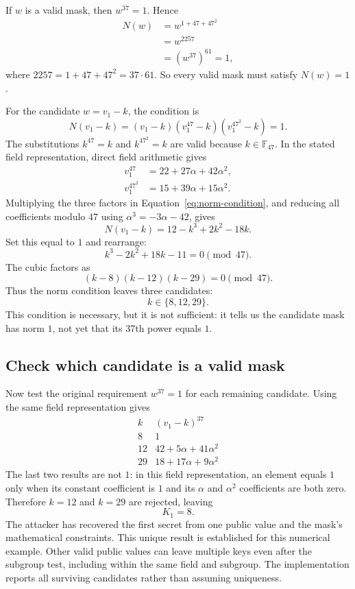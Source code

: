 \documentclass[11pt]{article}
\begin{document}
If $w$ is a valid mask, then $w^{37}=1$. Hence
\begin{align*}
    N(w)&=w^{1+47+47^2}\\
        &=w^{2257}\\
        &=(w^{37})^{61}=1,
\end{align*}
where $2257=1+47+47^2=37\cdot61$. So every valid mask must satisfy $N(w)=1$.

For the candidate $w=v_1-k$, the condition is
\begin{equation}
    N(v_1-k)=(v_1-k)(v_1^{47}-k)(v_1^{47^2}-k)=1.
    \label{eq:norm-condition}
\end{equation}
The substitutions $k^{47}=k$ and $k^{47^2}=k$ are valid because $k\in\mathbb F_{47}$. In the stated field representation, direct field arithmetic gives
\[
\begin{aligned}
    v_1^{47}&=22+27\alpha+42\alpha^2,\\
    v_1^{47^2}&=15+39\alpha+15\alpha^2.
\end{aligned}
\]
Multiplying the three factors in Equation~\eqref{eq:norm-condition}, and reducing all coefficients modulo $47$ using $\alpha^3=-3\alpha-42$, gives
\[
    N(v_1-k)=12-k^3+2k^2-18k.
\]
Set this equal to $1$ and rearrange:
\[
    k^3-2k^2+18k-11=0\pmod{47}.
\]
The cubic factors as
\[
    \boxed{(k-8)(k-12)(k-29)=0\pmod{47}.}
\]
Thus the norm condition leaves three candidates:
\[
    k\in\{8,12,29\}.
\]
This condition is necessary, but it is not sufficient: it tells us the candidate mask has norm $1$, not yet that its 37th power equals $1$.

\subsection{Check which candidate is a valid mask}

Now test the original requirement $w^{37}=1$ for each remaining candidate. Using the same field representation gives
\[
\begin{array}{c|c}
 k & (v_1-k)^{37}\\ \hline
 8  & 1\\
 12 & 42+5\alpha+41\alpha^2\\
 29 & 18+17\alpha+9\alpha^2
\end{array}
\]
The last two results are not $1$: in this field representation, an element equals $1$ only when its constant coefficient is $1$ and its $\alpha$ and $\alpha^2$ coefficients are both zero. Therefore $k=12$ and $k=29$ are rejected, leaving
\[
    \boxed{K_1=8.}
\]
The attacker has recovered the first secret from one public value and the mask's mathematical constraints. This unique result is established for this numerical example. Other valid
public values can leave multiple keys even after the subgroup test, including
within the same field and subgroup. The implementation reports all surviving
candidates rather than assuming uniqueness.
\end{document}
